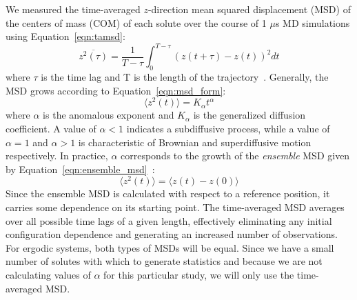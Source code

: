 \documentclass[journal=jpcbfk,manuscript=article]{achemso}
\begin{document}
  We measured the time-averaged $z$-direction mean squared displacement (MSD) of the
  centers of mass (COM) of each solute over the course of 1 $\mu$s MD simulations using 
  Equation~\ref{eqn:tamsd}:
  \begin{equation}
	\overline{z^2(\tau)} = \dfrac{1}{T - \tau}\int_{0}^{T - \tau} (z(t + \tau) - z(t))^2 dt
	\label{eqn:tamsd}
  \end{equation}
  where $\tau$ is the time lag and T is the length of the trajectory~\cite{meroz_toolbox_2015}. 
  Generally, the MSD grows according to Equation~\ref{eqn:msd_form}:
  \begin{equation} 
	\langle z^2(t) \rangle = K_{\alpha}t^\alpha
	\label{eqn:msd_form}
  \end{equation} 
  where $\alpha$ is the anomalous exponent and $K_\alpha$ is the generalized diffusion 
  coefficient. A value of $\alpha < 1$ indicates a subdiffusive process, while a value 
  of $\alpha = 1$ and $\alpha > 1$ is characteristic of Brownian and superdiffusive
  motion respectively.
  In practice, $\alpha$ corresponds to the growth of the \textit{ensemble} MSD given
  by Equation~\ref{eqn:ensemble_msd}~\cite{meroz_toolbox_2015}:
  \begin{equation}
	\langle z^2(t) \rangle = \langle z(t) - z(0) \rangle
	\label{eqn:ensemble_msd}
  \end{equation}
  Since the ensemble MSD is calculated with respect to a reference position, it carries
  some dependence on its starting point. The time-averaged MSD averages over all possible
  time lags of a given length, effectively eliminating any initial configuration 
  dependence and generating	an increased number of observations. For ergodic systems, 
  both types of MSDs will be equal. Since we have a small number of solutes with which to
  generate statistics and because we are not calculating values of $\alpha$ for this 
  particular study,	we will only use the time-averaged MSD.
  
\end{document}
